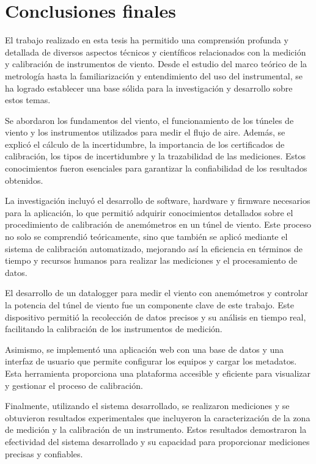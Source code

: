 \section{Conclusiones finales}
El trabajo realizado en esta tesis ha permitido una comprensión profunda y detallada de diversos aspectos técnicos y científicos relacionados con la medición y calibración de instrumentos de viento. Desde el estudio del marco teórico de la metrología hasta la familiarización y entendimiento del uso del instrumental, se ha logrado establecer una base sólida para la investigación y desarrollo sobre estos temas.

Se abordaron los fundamentos del viento, el funcionamiento de los túneles de viento y los instrumentos utilizados para medir el flujo de aire. Además, se explicó el cálculo de la incertidumbre, la importancia de los certificados de calibración, los tipos de incertidumbre y la trazabilidad de las mediciones. Estos conocimientos fueron esenciales para garantizar la confiabilidad de los resultados obtenidos.

La investigación incluyó el desarrollo de software, hardware y firmware necesarios para la aplicación, lo que permitió adquirir conocimientos detallados sobre el procedimiento de calibración de anemómetros en un túnel de viento. Este proceso no solo se comprendió teóricamente, sino que también se aplicó mediante el sistema de calibración automatizado, mejorando así la eficiencia en términos de tiempo y recursos humanos para realizar las mediciones y el procesamiento de datos.

El desarrollo de un datalogger para medir el viento con anemómetros y controlar la potencia del túnel de viento fue un componente clave de este trabajo. Este dispositivo permitió la recolección de datos precisos y su análisis en tiempo real, facilitando la calibración de los instrumentos de medición.

Asimismo, se implementó una aplicación web con una base de datos y una interfaz de usuario que permite configurar los equipos y cargar los metadatos. Esta herramienta proporciona una plataforma accesible y eficiente para visualizar y gestionar el proceso de calibración.

Finalmente, utilizando el sistema desarrollado, se realizaron mediciones y se obtuvieron resultados experimentales que incluyeron la caracterización de la zona de medición y la calibración de un instrumento. Estos resultados demostraron la efectividad del sistema desarrollado y su capacidad para proporcionar mediciones precisas y confiables.

